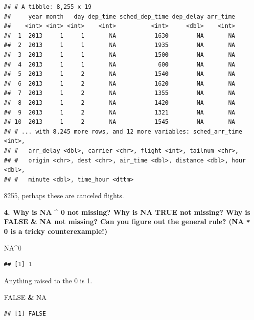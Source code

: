 \documentclass[]{book}
\newenvironment{Shaded}{\begin{snugshade}}{\end{snugshade}}
\newcommand{\DecValTok}[1]{\textcolor[rgb]{0.00,0.00,0.81}{#1}}
\newcommand{\OperatorTok}[1]{\textcolor[rgb]{0.81,0.36,0.00}{\textbf{#1}}}
\newcommand{\OtherTok}[1]{\textcolor[rgb]{0.56,0.35,0.01}{#1}}
\newcommand{\StringTok}[1]{\textcolor[rgb]{0.31,0.60,0.02}{#1}}
\theoremstyle{definition}
\theoremstyle{definition}
\theoremstyle{definition}
\theoremstyle{remark}
\begin{document}
\begin{verbatim}
## # A tibble: 8,255 x 19
##     year month   day dep_time sched_dep_time dep_delay arr_time
##    <int> <int> <int>    <int>          <int>     <dbl>    <int>
##  1  2013     1     1       NA           1630        NA       NA
##  2  2013     1     1       NA           1935        NA       NA
##  3  2013     1     1       NA           1500        NA       NA
##  4  2013     1     1       NA            600        NA       NA
##  5  2013     1     2       NA           1540        NA       NA
##  6  2013     1     2       NA           1620        NA       NA
##  7  2013     1     2       NA           1355        NA       NA
##  8  2013     1     2       NA           1420        NA       NA
##  9  2013     1     2       NA           1321        NA       NA
## 10  2013     1     2       NA           1545        NA       NA
## # ... with 8,245 more rows, and 12 more variables: sched_arr_time <int>,
## #   arr_delay <dbl>, carrier <chr>, flight <int>, tailnum <chr>,
## #   origin <chr>, dest <chr>, air_time <dbl>, distance <dbl>, hour <dbl>,
## #   minute <dbl>, time_hour <dttm>
\end{verbatim}

8255, perhaps these are canceled flights.

\textbf{4. Why is NA \^{} 0 not missing? Why is NA \textbar{} TRUE not
missing? Why is FALSE \& NA not missing? Can you figure out the general
rule? (NA \texttt{*} 0 is a tricky counterexample!)}

\begin{Shaded}
\begin{Highlighting}[]
\OtherTok{NA}\OperatorTok{^}\DecValTok{0}
\end{Highlighting}
\end{Shaded}

\begin{verbatim}
## [1] 1
\end{verbatim}

Anything raised to the 0 is 1.

\begin{Shaded}
\begin{Highlighting}[]
\OtherTok{FALSE} \OperatorTok{&}\StringTok{ }\OtherTok{NA}
\end{Highlighting}
\end{Shaded}

\begin{verbatim}
## [1] FALSE
\end{verbatim}
\end{document}
